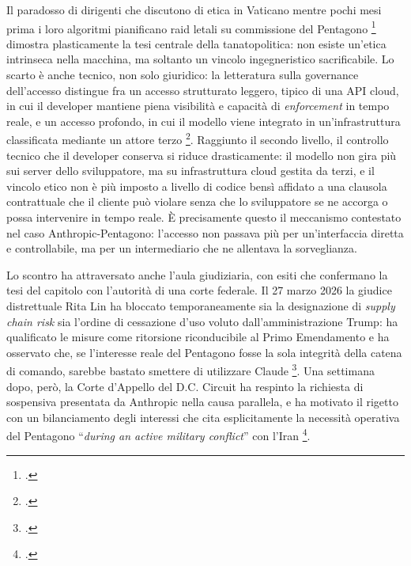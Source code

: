 \documentclass[a4paper,12pt]{report}
\begin{document}
Il paradosso di dirigenti che discutono di etica in Vaticano mentre pochi mesi
prima i loro algoritmi pianificano raid letali su commissione del Pentagono
\footcite{ruzic_2026} dimostra plasticamente la tesi centrale della
tanatopolitica: non esiste un'etica intrinseca nella macchina, ma soltanto un
vincolo ingegneristico sacrificabile. Lo scarto è anche tecnico, non solo
giuridico: la letteratura sulla governance dell'accesso distingue fra un accesso
strutturato leggero, tipico di una API cloud, in cui il developer mantiene piena
visibilità e capacità di \textit{enforcement} in tempo reale, e un accesso
profondo, in cui il modello viene integrato in un'infrastruttura classificata
mediante un attore terzo \footcite{shevlane_2022_access}. Raggiunto il secondo livello, il controllo tecnico che il developer conserva si
riduce drasticamente: il modello non gira più sui server dello sviluppatore, ma
su infrastruttura cloud gestita da terzi, e il vincolo etico non è più
imposto a livello di codice bensì affidato a una clausola contrattuale che il
cliente può violare senza che lo sviluppatore se ne accorga o possa intervenire
in tempo reale. È precisamente questo il meccanismo contestato nel caso
Anthropic-Pentagono: l'accesso non passava più per un'interfaccia diretta e
controllabile, ma per un intermediario che ne allentava la sorveglianza.

Lo scontro ha attraversato anche l'aula giudiziaria, con esiti che confermano la
tesi del capitolo con l'autorità di una corte federale. Il 27 marzo 2026 la
giudice distrettuale Rita Lin ha bloccato temporaneamente sia la designazione di
\textit{supply chain risk} sia l'ordine di cessazione d'uso voluto
dall'amministrazione Trump: ha qualificato le misure come ritorsione riconducibile
al Primo Emendamento e ha osservato che, se l'interesse reale del Pentagono fosse
la sola integrità della catena di comando, sarebbe bastato smettere di utilizzare
Claude \footcite{thehill_2026_lin}. Una settimana dopo, però, la Corte d'Appello
del D.C. Circuit ha respinto la richiesta di sospensiva presentata da Anthropic
nella causa parallela, e ha motivato il rigetto con un bilanciamento degli
interessi che cita esplicitamente la necessità operativa del Pentagono
``\textit{during an active military conflict}'' con l'Iran
\footcite{thehill_2026_appello}.
\end{document}
